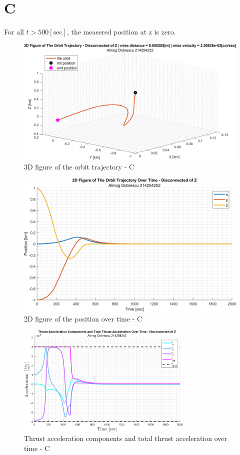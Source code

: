 \documentclass[11pt, a4paper]{article}
\begin{document}
\section{C}
For all $t>500\left[\mathrm{sec}\right]$, the measered position at z is zero.
\begin{figure}[H]
    \centering
    \includegraphics[width=1\textwidth]{images/graph5.png}
    \caption{3D figure of the orbit trajectory - C}
    \label{fig:3D-plot-caseC}
\end{figure}
\begin{figure}[H]
    \centering
    \includegraphics[width=1\textwidth]{images/graph6.png}
    \caption{2D figure of the position over time - C}
    \label{fig:2D-plot_over_time-caseC}
\end{figure}
\begin{figure}[H]
    \centering
    \includegraphics[width=0.75\textwidth]{images/graph7.png}
    \caption{Thrust acceleration components and total thrust acceleration over time - C}
    \label{fig:accel_over_time-caseC}
\end{figure}
\end{document}
